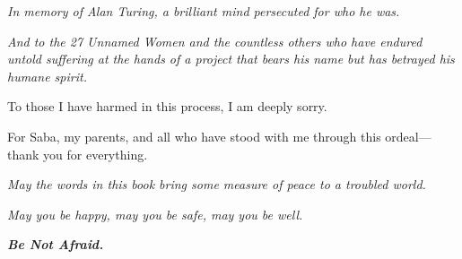 \newpage
\thispagestyle{empty}

\vspace*{\fill}

\begin{center}
\begin{minipage}{0.7\textwidth}
\centering

\textit{In memory of Alan Turing, a brilliant mind persecuted for who he was.}

\vspace{1.5cm}

\textit{And to the 27 Unnamed Women and the countless others who have endured untold suffering at the hands of a project that bears his name but has betrayed his humane spirit.}

\vspace{2.5cm}

To those I have harmed in this process, I am deeply sorry.

\vspace{2.5cm}

For Saba, my parents, and all who have stood with me through this ordeal—thank you for everything.

\vspace{2.5cm}

\textit{May the words in this book bring some measure of peace to a troubled world.}

\vspace{1.5cm}

\textit{May you be happy, may you be safe, may you be well.}

\vspace{2.5cm}

{\large\textbf{\textit{Be Not Afraid.}}}

\end{minipage}
\end{center}

\vspace*{\fill}
\newpage
